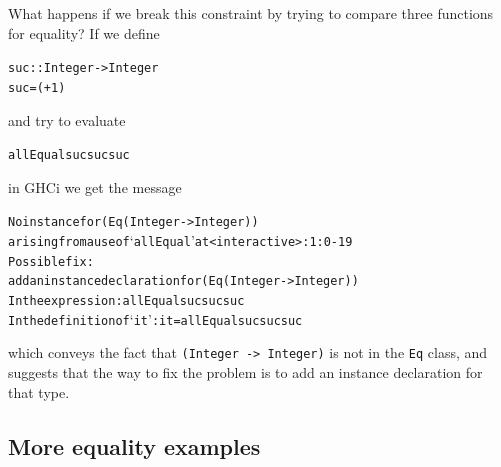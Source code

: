 What happens if we break this constraint by trying
to compare three functions for equality? If we define
\begin{alltt}
suc :: Integer -> Integer
suc = (+1)
\end{alltt}
and try to evaluate
\begin{alltt}
allEqual suc suc suc 
\end{alltt}
in GHCi we get the message
\begin{alltt}
    No instance for (Eq (Integer -> Integer))
      arising from a use of `allEqual' at <interactive>:1:0-19
    Possible fix:
      add an instance declaration for (Eq (Integer -> Integer))
    In the expression: allEqual suc suc suc
    In the definition of `it': it = allEqual suc suc suc
\end{alltt}
which conveys the fact that \texttt{(Integer -> Integer)} is not in the \texttt{Eq} class, and suggests that the way to fix the problem is to add an instance declaration for that type. 

\subsection*{More equality examples}

